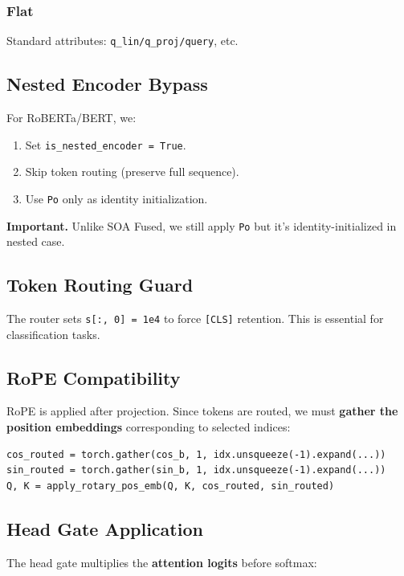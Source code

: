 \subsubsection{Flat}

Standard attributes: \texttt{q\_lin/q\_proj/query}, etc.

\subsection{Nested Encoder Bypass}

For RoBERTa/BERT, we:
\begin{enumerate}
\item Set \texttt{is\_nested\_encoder = True}.
\item Skip token routing (preserve full sequence).
\item Use \texttt{Po} only as identity initialization.

\end{enumerate}
\textbf{Important.} Unlike SOA Fused, we still apply \texttt{Po} but it's identity-initialized 
in nested case.

\subsection{Token Routing Guard}

The router sets \texttt{s[:, 0] = 1e4} to force \texttt{[CLS]} retention. This is 
essential for classification tasks.

\subsection{RoPE Compatibility}

RoPE is applied after projection. Since tokens are routed, we must 
\textbf{gather the position embeddings} corresponding to selected indices:

\begin{lstlisting}
cos_routed = torch.gather(cos_b, 1, idx.unsqueeze(-1).expand(...))
sin_routed = torch.gather(sin_b, 1, idx.unsqueeze(-1).expand(...))
Q, K = apply_rotary_pos_emb(Q, K, cos_routed, sin_routed)
\end{lstlisting}

\subsection{Head Gate Application}

The head gate multiplies the \textbf{attention logits} before softmax:

